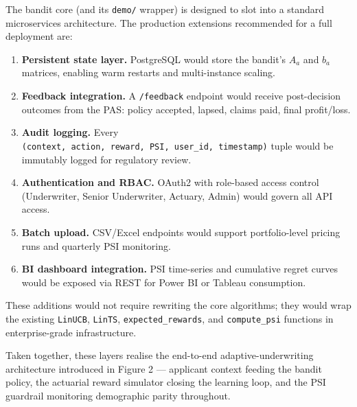 The bandit core (and its \texttt{demo/} wrapper) is designed to slot into a standard microservices architecture. The production extensions recommended for a full deployment are:

\begin{enumerate}
\def\labelenumi{\arabic{enumi}.}
\tightlist
\item
  \textbf{Persistent state layer.} PostgreSQL would store the bandit's \(A_a\) and \(b_a\) matrices, enabling warm restarts and multi-instance scaling.
\item
  \textbf{Feedback integration.} A \texttt{/feedback} endpoint would receive post-decision outcomes from the PAS: policy accepted, lapsed, claims paid, final profit/loss.
\item
  \textbf{Audit logging.} Every \texttt{(context,\ action,\ reward,\ PSI,\ user\_id,\ timestamp)} tuple would be immutably logged for regulatory review.
\item
  \textbf{Authentication and RBAC.} OAuth2 with role-based access control (Underwriter, Senior Underwriter, Actuary, Admin) would govern all API access.
\item
  \textbf{Batch upload.} CSV/Excel endpoints would support portfolio-level pricing runs and quarterly PSI monitoring.
\item
  \textbf{BI dashboard integration.} PSI time-series and cumulative regret curves would be exposed via REST for Power BI or Tableau consumption.
\end{enumerate}

These additions would not require rewriting the core algorithms; they would wrap the existing \texttt{LinUCB}, \texttt{LinTS}, \texttt{expected\_rewards}, and \texttt{compute\_psi} functions in enterprise-grade infrastructure.

Taken together, these layers realise the end-to-end adaptive-underwriting architecture introduced in Figure 2 --- applicant context feeding the bandit policy, the actuarial reward simulator closing the learning loop, and the PSI guardrail monitoring demographic parity throughout.
